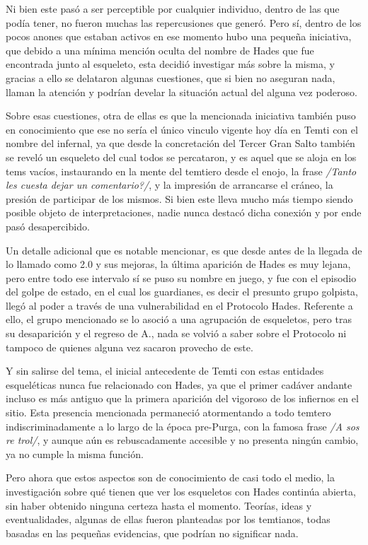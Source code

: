 \documentclass[
]{book}
\begin{document}
Ni bien este pasó a ser perceptible por cualquier individuo, dentro de las que podía tener, no fueron muchas las repercusiones que generó. Pero sí, dentro de los pocos anones que estaban activos en ese momento hubo una pequeña iniciativa, que debido a una mínima mención oculta del nombre de Hades que fue encontrada junto al esqueleto, esta decidió investigar más sobre la misma, y gracias a ello se delataron algunas cuestiones, que si bien no aseguran nada, llaman la atención y podrían develar la situación actual del alguna vez poderoso.

Sobre esas cuestiones, otra de ellas es que la mencionada iniciativa también puso en conocimiento que ese no sería el único vinculo vigente hoy día en Temti con el nombre del infernal, ya que desde la concretación del Tercer Gran Salto también se reveló un esqueleto del cual todos se percataron, y es aquel que se aloja en los tems vacíos, instaurando en la mente del temtiero desde el enojo, la frase \emph{/Tanto les cuesta dejar un comentario?/}, y la impresión de arrancarse el cráneo, la presión de participar de los mismos. Si bien este lleva mucho más tiempo siendo posible objeto de interpretaciones, nadie nunca destacó dicha conexión y por ende pasó desapercibido.

Un detalle adicional que es notable mencionar, es que desde antes de la llegada de lo llamado como 2.0 y sus mejoras, la última aparición de Hades es muy lejana, pero entre todo ese intervalo sí se puso su nombre en juego, y fue con el episodio del golpe de estado, en el cual los guardianes, es decir el presunto grupo golpista, llegó al poder a través de una vulnerabilidad en el Protocolo Hades. Referente a ello, el grupo mencionado se lo asoció a una agrupación de esqueletos, pero tras su desaparición y el regreso de A., nada se volvió a saber sobre el Protocolo ni tampoco de quienes alguna vez sacaron provecho de este.

Y sin salirse del tema, el inicial antecedente de Temti con estas entidades esqueléticas nunca fue relacionado con Hades, ya que el primer cadáver andante incluso es más antiguo que la primera aparición del vigoroso de los infiernos en el sitio. Esta presencia mencionada permaneció atormentando a todo temtero indiscriminadamente a lo largo de la época pre-Purga, con la famosa frase \emph{/A sos re trol/}, y aunque aún es rebuscadamente accesible y no presenta ningún cambio, ya no cumple la misma función.

Pero ahora que estos aspectos son de conocimiento de casi todo el medio, la investigación sobre qué tienen que ver los esqueletos con Hades continúa abierta, sin haber obtenido ninguna certeza hasta el momento. Teorías, ideas y eventualidades, algunas de ellas fueron planteadas por los temtianos, todas basadas en las pequeñas evidencias, que podrían no significar nada.
\end{document}
